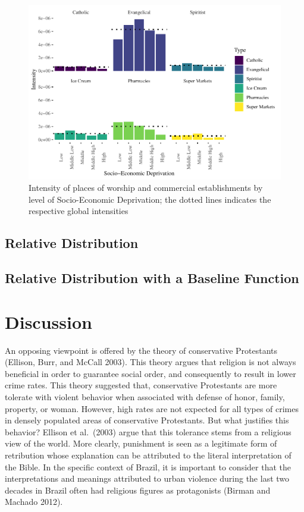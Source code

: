 \documentclass[smallextended]{svjour3}       %
\begin{document}
\begin{figure}
\centering
\includegraphics{Moral_Communities_and_Crime_v1_files/figure-latex/plot-events-quadrat-1.pdf}
\caption{\label{fig:plot-events-quadrat}Intensity of places of worship
and commercial establishments by level of Socio-Economic Deprivation;
the dotted lines indicates the respective global intensities}
\end{figure}

\hypertarget{relative-distribution}{%
\subsection{Relative Distribution}\label{relative-distribution}}

\hypertarget{relative-distribution-with-a-baseline-function}{%
\subsection{Relative Distribution with a Baseline
Function}\label{relative-distribution-with-a-baseline-function}}

\hypertarget{discussion}{%
\section{Discussion}\label{discussion}}

An opposing viewpoint is offered by the theory of conservative
Protestants (Ellison, Burr, and McCall 2003). This theory argues that
religion is not always beneficial in order to guarantee social order,
and consequently to result in lower crime rates. This theory suggested
that, conservative Protestants are more tolerate with violent behavior
when associated with defense of honor, family, property, or woman.
However, high rates are not expected for all types of crimes in densely
populated areas of conservative Protestants. But what justifies this
behavior? Ellison et al.~(2003) argue that this tolerance stems from a
religious view of the world. More clearly, punishment is seen as a
legitimate form of retribution whose explanation can be attributed to
the literal interpretation of the Bible. In the specific context of
Brazil, it is important to consider that the interpretations and
meanings attributed to urban violence during the last two decades in
Brazil often had religious figures as protagonists (Birman and Machado
2012).
\end{document}
